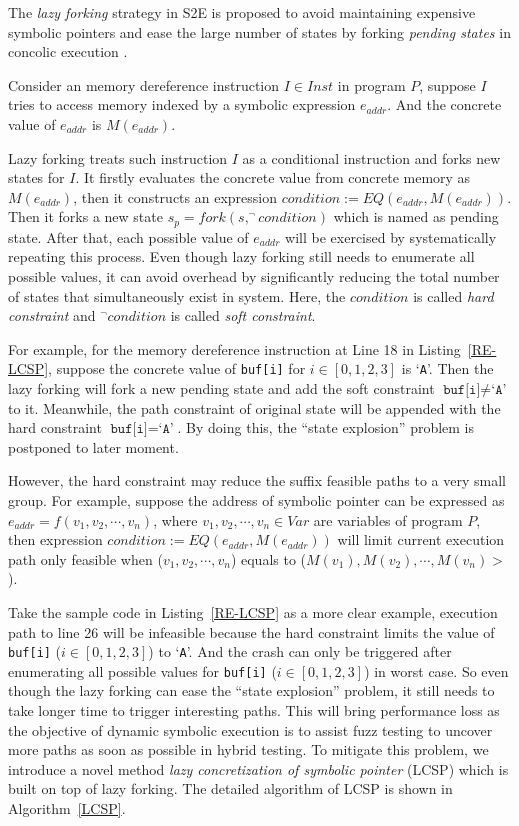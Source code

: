 The \textit{lazy forking} strategy in S2E is proposed to avoid maintaining expensive symbolic pointers and ease the large number of states by forking \textit{pending states} in concolic execution \cite{chipounov2011s2e}. 

Consider an memory dereference instruction $I\in Inst$ in program $P$, suppose $I$ tries to access memory indexed by a symbolic expression $e_{addr}$. And the concrete value of $e_{addr}$ is $M(e_{addr})$.

Lazy forking treats such instruction $I$ as a conditional instruction and forks new states for $I$. It firstly evaluates the concrete value from concrete memory as $M(e_{addr})$, then it constructs an expression $condition:= EQ(e_{addr}, M(e_{addr}))$. Then it forks a new state $s_p=fork(s, ^\neg condition)$ which is named as pending state. After that, each possible value of $e_{addr}$ will be exercised by systematically repeating this process. Even though lazy forking still needs to enumerate all possible values, it can avoid overhead by significantly reducing the total number of states that simultaneously exist in system. Here, the $condition$ is called \textit{hard constraint} and $^\neg condition$ is called \textit{soft constraint}.

For example, for the memory dereference instruction at Line 18 in Listing~\ref{RE-LCSP}, suppose the concrete value of \texttt{buf[i]} for $i\in[0,1,2,3]$ is `\texttt{A}'. 
Then the lazy forking will fork a new pending state and add the soft constraint $\texttt{buf[i]}\neq\texttt{`A'}$ to it. Meanwhile, the path constraint of original state will be appended with the hard constraint $\texttt{buf[i]}=\texttt{`A'}$.
By doing this, the ``state explosion'' problem is postponed to later moment.

However, the hard constraint may reduce the suffix feasible paths to a very small group. For example, suppose the address of symbolic pointer can be expressed as $e_{addr}=f(v_1, v_2,\cdots, v_n)$, where $v_1, v_2,\cdots, v_n\in Var$ are variables of program $P$, then expression $condition:= EQ(e_{addr}, M(e_{addr}))$ will limit current execution path only feasible when ($v_1, v_2,\cdots, v_n$) equals to ($M(v_1), M(v_2),\cdots, M(v_n)>$). 

Take the sample code in Listing~\ref{RE-LCSP} as a more clear example, execution path to line 26 will be infeasible because the hard constraint limits the value of \texttt{buf[i]} ($i\in[0,1,2,3]$) to `\texttt{A}'. And the crash can only be triggered after enumerating all possible values for \texttt{buf[i]} ($i\in[0,1,2,3]$) in worst case.
So even though the lazy forking can ease the ``state explosion'' problem, it still needs to take longer time to trigger interesting paths. This will bring performance loss as the objective of dynamic symbolic execution is to assist fuzz testing to uncover more paths as soon as possible in hybrid testing. 
To mitigate this problem, we introduce a novel method \emph{lazy concretization of symbolic pointer} (LCSP) which is built on top of lazy forking. The detailed algorithm of LCSP is shown in Algorithm~\ref{LCSP}.


